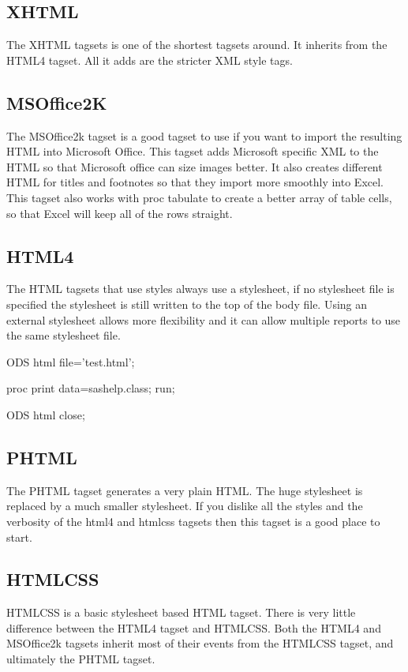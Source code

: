 \subsection{XHTML}
The XHTML tagsets is one of the shortest tagsets around.  It inherits from the HTML4
tagset.  All it adds are the stricter XML style tags.

\subsection{MSOffice2K}
The MSOffice2k tagset is a good tagset to use if you want to import the resulting HTML
into Microsoft Office.  This tagset adds Microsoft specific XML to the HTML so that 
Microsoft office can size images better.  It also creates different HTML for titles and
footnotes so that they import more smoothly into Excel.  This tagset also works with proc
tabulate to create a better array of table cells, so that Excel will keep all of the
rows straight.


\subsection{HTML4}
The HTML tagsets that use styles always use a stylesheet, if no stylesheet file
is specified the stylesheet is still written to the top of the
body file.  Using an external stylesheet allows more flexibility
and it can allow multiple reports to use the same stylesheet file.

\begin{sfvcode}
   ODS html file='test.html';

   proc print data=sashelp.class; run;

   ODS html close;
\end{sfvcode}



\subsection{PHTML}
The PHTML tagset generates a very plain HTML.  The huge stylesheet is replaced
by a much smaller stylesheet.  If you dislike all the styles and the verbosity
of the html4 and htmlcss tagsets then this tagset is a good place to start.


\subsection{HTMLCSS}
HTMLCSS is a basic stylesheet based HTML tagset.  There is very little difference
between the HTML4 tagset and HTMLCSS. Both the HTML4 and MSOffice2k tagsets inherit
most of their events from the HTMLCSS tagset, and ultimately the PHTML tagset.

